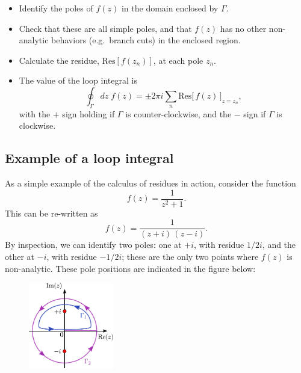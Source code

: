 \documentclass[10pt,a4paper]{article}
\begin{document}
\begin{itemize}
\item
  Identify the poles of $f(z)$ in the domain enclosed by $\Gamma$.
\item
  Check that these are all simple poles, and that $f(z)$ has no other
  non-analytic behaviors (e.g.~branch cuts) in the enclosed region.
\item
  Calculate the residue, $\mathrm{Res}[f(z_n)]$, at each pole $z_n$.
\item
  The value of the loop integral is
\begin{equation}
\oint_\Gamma dz\; f(z) = \pm 2\pi i \sum_n \mathrm{Res}\big[\,f(z)\,\big]_{z = z_n},
\end{equation}
with the $+$ sign holding if $\Gamma$ is counter-clockwise, and the
$-$ sign if $\Gamma$ is clockwise.
\end{itemize}

\subsection{Example of a loop integral}
\label{loop_example}

As a simple example of the calculus of residues in action, consider the
function
\begin{equation}
  f(z) = \frac{1}{z^2 + 1}.
\end{equation}
This can be re-written as
\begin{equation}
  f(z) = \frac{1}{(z + i)\,(z-i)}.
\end{equation}
By inspection, we can identify two poles: one at $+i$, with residue
$1/2i$, and the other at $-i$, with residue $-1/2i$; these are the
only two points where $f(z)$ is non-analytic.  These pole positions
are indicated in the figure below:

\begin{figure}[h]
  \centering\includegraphics[width=0.33\textwidth]{contour_example1}
\end{figure}
\end{document}
